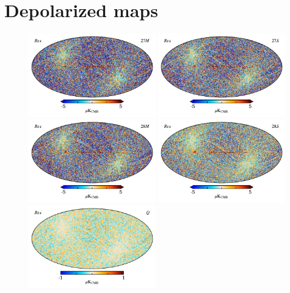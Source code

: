 \documentclass{aa}
\begin{document}
\section{Depolarized maps}
\label{sec:depol}

\begin{figure}
  \centering
  \includegraphics[width=0.49\textwidth]{figs/sim_diff_T_27M.pdf}
  \includegraphics[width=0.49\textwidth]{figs/sim_diff_T_27S.pdf}\\
  \includegraphics[width=0.49\textwidth]{figs/sim_diff_T_28M.pdf}
  \includegraphics[width=0.49\textwidth]{figs/sim_diff_T_28S.pdf}\\
  \includegraphics[width=0.49\textwidth]{figs/sim_diff_Q.pdf}

\end{figure}
\end{document}

